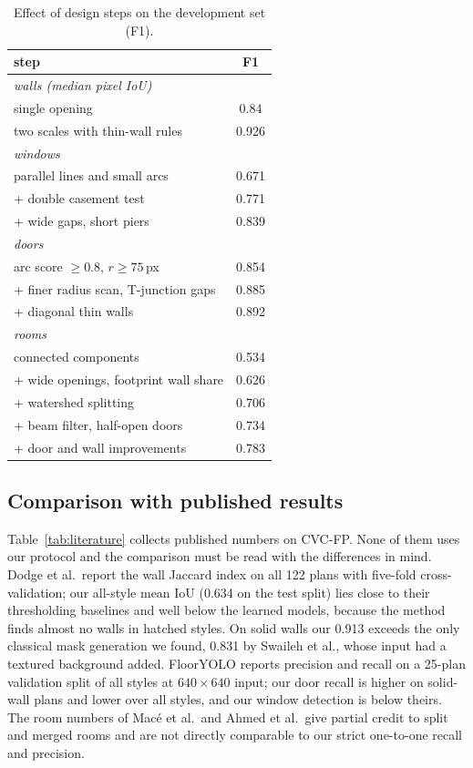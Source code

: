 \documentclass[conference]{IEEEtran}
\begin{document}
\begin{table}[t]
\centering
\caption{Effect of design steps on the development set (F1).}
\label{tab:ablation}
\begin{tabular}{lc}
\toprule
step & F1 \\
\midrule
\multicolumn{2}{l}{\emph{walls (median pixel IoU)}} \\
single opening & 0.84 \\
two scales with thin-wall rules & 0.926 \\
\midrule
\multicolumn{2}{l}{\emph{windows}} \\
parallel lines and small arcs & 0.671 \\
+ double casement test & 0.771 \\
+ wide gaps, short piers & 0.839 \\
\midrule
\multicolumn{2}{l}{\emph{doors}} \\
arc score $\geq 0.8$, $r \geq 75$\,px & 0.854 \\
+ finer radius scan, T-junction gaps & 0.885 \\
+ diagonal thin walls & 0.892 \\
\midrule
\multicolumn{2}{l}{\emph{rooms}} \\
connected components & 0.534 \\
+ wide openings, footprint wall share & 0.626 \\
+ watershed splitting & 0.706 \\
+ beam filter, half-open doors & 0.734 \\
+ door and wall improvements & 0.783 \\
\bottomrule
\end{tabular}
\end{table}

\subsection{Comparison with published results}

Table~\ref{tab:literature} collects published numbers on CVC-FP. None of
them uses our protocol and the comparison must be read with the differences
in mind. Dodge et al.\ report the wall Jaccard index on all 122 plans with
five-fold cross-validation; our all-style mean IoU (0.634 on the test split)
lies close to their thresholding baselines and well below the learned
models, because the method finds almost no walls in hatched styles. On
solid walls our 0.913 exceeds the only classical mask generation we found,
0.831 by Swaileh et al., whose input had a textured background added.
FloorYOLO reports precision and recall on a 25-plan validation split of all
styles at $640\times640$ input; our door recall is higher on solid-wall
plans and lower over all styles, and our window detection is below theirs.
The room numbers of Mac\'e et al.\ and Ahmed et al.\ give partial credit to
split and merged rooms and are not directly comparable to our strict
one-to-one recall and precision.
\end{document}
